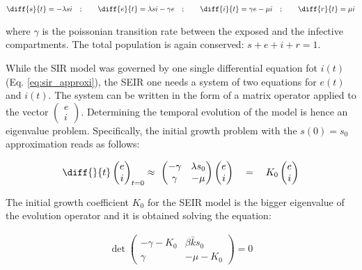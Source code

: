 \documentclass[DIV=12, BCOR=0pt]{scrartcl}  %
\begin{document}
  \begin{align}
  	\diff{s}{t} = - \lambda s i \quad;  \qquad 	\diff{e}{t} = \lambda s i - \gamma e \quad; \qquad \diff{i}{t} = \gamma e - \mu i \quad; \qquad \diff{r}{t} = \mu i
  	\label{eq:seir}
  \end{align}

  where $\gamma$ is the poissonian transition rate between the exposed and the infective compartments. The total population is again conserved: $ s + e + i + r = 1$.
  
  While the SIR model was governed by one single differential equation fot $i(t)$ (Eq. \ref{eq:sir_approxi}), the SEIR one needs a system of two equations for $e(t)$ and $i(t)$.
  The system can be written in the form of a matrix operator applied to the vector $ \left( \begin{smallmatrix} e \\	i \end{smallmatrix} \right)$. Determining the temporal evolution of the model is hence an eigenvalue problem. Specifically, the initial growth problem with the $s(0) = s_0$ approximation reads as follows: 
  
  \begin{align}
  	\diff{}{t}
  	\begin{pmatrix}
  			e \\
  			i
  	\end{pmatrix}_{t=0}
  	\approx \
  	\begin{pmatrix}
  		 - \gamma & \lambda s_0\\
  		 \gamma & - \mu
  	\end{pmatrix}
  	\begin{pmatrix}
  		e \\
  		i
  	\end{pmatrix}
	  \quad = \quad K_0 %
	  \begin{pmatrix}
	  	e \\
	  	i
	  \end{pmatrix} %
		\label{eq:seir_approxi}
	\end{align}

The initial growth coefficient $K_0$ for the SEIR model is the bigger eigenvalue of the evolution operator and it is obtained solving the equation: 

	\begin{align}
		\det 
		\begin{pmatrix}
			- \gamma - K_0 & \beta \bar{k} s_0\\ %
			\gamma & - \mu - K_0  %
		\end{pmatrix} = 0
	\label{eq:seir_K0}
	\end{align}
 
\end{document}
